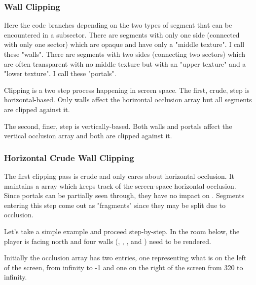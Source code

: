 \subsubsection{Wall Clipping}
Here the code branches depending on the two types of segment that can be encountered in a subsector. There are segments with only one side (connected with only one sector) which are opaque and have only a "middle texture". I call these "walls". There are segments with two sides (connecting two sectors) which are often transparent with no middle texture but with an "upper texture" and a "lower texture". I call these "portals".\\
\par
Clipping is a two step process happening in screen space. The first, crude, step is horizontal-based. Only walls affect the horizontal occlusion array but all segments are clipped against it.\\
\par
The second, finer, step is vertically-based. Both walls and portals affect the vertical occlusion array and both are clipped against it.









\subsubsection{Horizontal Crude Wall Clipping}
The first clipping pass is crude and only cares about horizontal occlusion. It maintains a  array which keeps track of the screen-space horizontal occlusion. Since portals can be partially seen through, they have no impact on . Segments entering this step come out as "fragments" since they may be split due to occlusion.\\
\par
{}
\par
Let's take a simple example and proceed step-by-step. In the room below, the player is facing north and four walls (, , , and ) need to be rendered.\\
\par
{}
\par
\vspace{-3mm}
Initially the occlusion array has two entries, one representing what is on the left of the screen, from infinity to -1 and one on the right of the screen from 320 to infinity.
\par 
\begin{minipage}{0.54\textwidth}
\vspace*{2.5mm}
\end{minipage}
\begin{minipage}{0.46\textwidth}
\end{minipage}
\par






